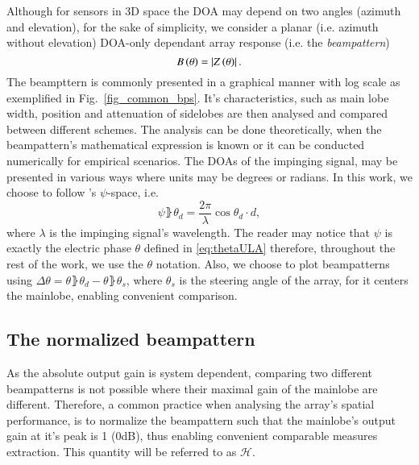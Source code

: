 Although for sensors in 3D space the DOA may depend on two angles (azimuth and elevation), for the sake of simplicity, we consider a planar (i.e. azimuth without elevation) DOA-only dependant array response (i.e. the \emph{beampattern})
\begin{equation}
B\left({\theta}\right) = \left\vert Z\left({\theta}\right)\right\vert.
\end{equation}
The beampttern is commonly presented in a graphical manner with log scale as exemplified in Fig.~\ref{fig_common_bps}.
It's characteristics, such as main lobe width, position and attenuation of sidelobes are then analysed and compared between different schemes.
The analysis can be done theoretically, when the beampattern's mathematical expression is known or it can be conducted numerically for empirical scenarios.
The DOAs of the impinging signal, may be presented in various ways where units may be degrees or radians.
In this work, we choose to follow \cite{van2004optimum}'s $\psi$-space, i.e.
\begin{equation}
    \psi\rBrace{\theta_{d}}=\frac{2\pi}{\lambda}\cos{\theta_{d}}\cdot{}d,
\end{equation}
where $\lambda$ is the impinging signal's wavelength.
The reader may notice that $\psi$ is exactly the electric phase $\theta$ defined in \eqref{eq:thetaULA} therefore, throughout the rest of the work, we use the $\theta$ notation. 
Also, we choose to plot beampatterns using $\Delta\theta = \theta\rBrace{\theta_{d}} - \theta\rBrace{\theta_{s}}$, where $\theta_{s}$ is the steering angle of the array, for it centers the mainlobe, enabling convenient comparison.
\subsection{The normalized beampattern}
As the absolute output gain is system dependent, comparing two different beampatterns is not possible where their maximal gain of the mainlobe are different.
Therefore, a common practice \cite{van2004optimum} when analysing the array's spatial performance, is to normalize the beampattern such that the mainlobe's output gain at it's peak is 1 (0dB), thus enabling convenient comparable measures extraction.
This quantity will be referred to as $\mathcal{H}$.
